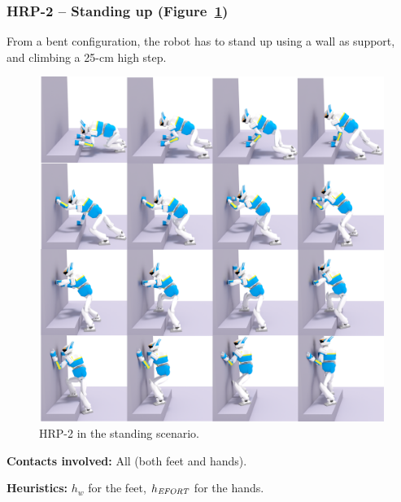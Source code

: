 \subsubsection{HRP-2 -- Standing up (Figure~\ref{fig:standing})}
From a bent configuration, the robot has to stand up using a wall as support, and climbing a 25-cm high step.

\begin{figure}
  \centering
  \includegraphics[width=1\linewidth]{figures/standing}
  \caption{
           HRP-2 in the standing scenario. }
		   \label{fig:standing}
\end{figure}


\noindent\textbf{Contacts involved:} All (both feet and hands).

\noindent\textbf{Heuristics:} $h_w$ for the feet, $h_{\textrm{\it EFORT}}$  for the hands.



